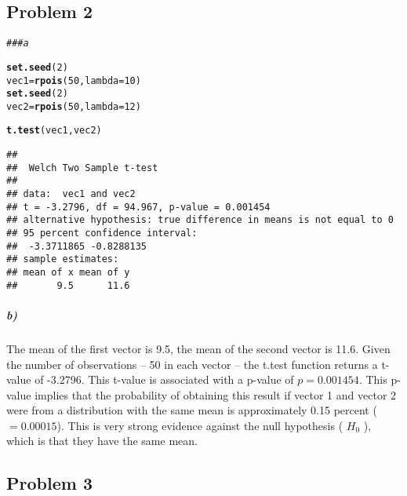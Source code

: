 \documentclass[12pt,letter]{article}\usepackage[]{graphicx}\usepackage[]{color}
\makeatletter
\newcommand{\hlnum}[1]{\textcolor[rgb]{0.686,0.059,0.569}{#1}}%
\newcommand{\hlcom}[1]{\textcolor[rgb]{0.678,0.584,0.686}{\textit{#1}}}%
\newcommand{\hlstd}[1]{\textcolor[rgb]{0.345,0.345,0.345}{#1}}%
\newcommand{\hlkwb}[1]{\textcolor[rgb]{0.69,0.353,0.396}{#1}}%
\newcommand{\hlkwc}[1]{\textcolor[rgb]{0.333,0.667,0.333}{#1}}%
\newcommand{\hlkwd}[1]{\textcolor[rgb]{0.737,0.353,0.396}{\textbf{#1}}}%
\newenvironment{kframe}{%
 \def\at@end@of@kframe{}%
 \ifinner\ifhmode%
  \def\at@end@of@kframe{\end{minipage}}%
  \begin{minipage}{\columnwidth}%
 \fi\fi%
 \def\FrameCommand##1{\hskip\@totalleftmargin \hskip-\fboxsep
 \colorbox{shadecolor}{##1}\hskip-\fboxsep
     \hskip-\linewidth \hskip-\@totalleftmargin \hskip\columnwidth}%
 \MakeFramed {\advance\hsize-\width
   \@totalleftmargin\z@ \linewidth\hsize
   \@setminipage}}%
 {\par\unskip\endMakeFramed%
 \at@end@of@kframe}
\newenvironment{knitrout}{}{} %
\makeatother
\begin{document}
\subsection*{Problem 2}

\begin{knitrout}
\color{fgcolor}\begin{kframe}
\begin{alltt}
\hlcom{### a}

\hlkwd{set.seed}\hlstd{(}\hlnum{2}\hlstd{)}
\hlstd{vec1} \hlkwb{=} \hlkwd{rpois}\hlstd{(}\hlnum{50}\hlstd{,} \hlkwc{lambda} \hlstd{=} \hlnum{10}\hlstd{)}
\hlkwd{set.seed}\hlstd{(}\hlnum{2}\hlstd{)}
\hlstd{vec2} \hlkwb{=} \hlkwd{rpois}\hlstd{(}\hlnum{50}\hlstd{,} \hlkwc{lambda} \hlstd{=} \hlnum{12}\hlstd{)}

\hlkwd{t.test}\hlstd{(vec1, vec2)}
\end{alltt}
\begin{verbatim}
## 
## 	Welch Two Sample t-test
## 
## data:  vec1 and vec2
## t = -3.2796, df = 94.967, p-value = 0.001454
## alternative hypothesis: true difference in means is not equal to 0
## 95 percent confidence interval:
##  -3.3711865 -0.8288135
## sample estimates:
## mean of x mean of y 
##       9.5      11.6
\end{verbatim}
\end{kframe}
\end{knitrout}

\subparagraph{b)} The mean of the first vector is 9.5, the mean of the second vector is 11.6. Given the number of observations -- 50 in each vector -- the t.test function returns a t-value of -3.2796. This t-value is associated with a p-value of $p = 0.001454$. This p-value implies that the probability of obtaining this result if vector 1 and vector 2 were from a distribution with the same mean is approximately 0.15 percent ($= 0.00015$). This is very strong evidence against the null hypothesis ( $H_0$ ), which is that they have the same mean.



\subsection*{Problem 3}
\end{document}
